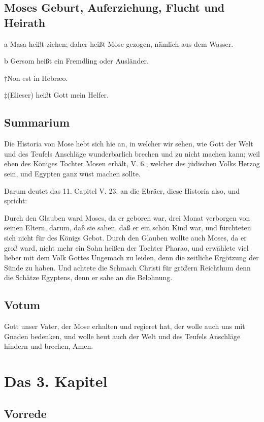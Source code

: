 \section{Moses Geburt, Auferziehung, Flucht und Heirath}

a Masa heißt ziehen; daher heißt Mose gezogen, nämlich aus dem Wasser.

b Gersom heißt ein Fremdling oder Ausländer.

†Non est in Hebræo.

‡(Elieser) heißt Gott mein Helfer.

\section{Summarium}

Die Historia von Mose hebt sich hie an, in welcher wir sehen, wie Gott der Welt und des Teufels Anschläge wunderbarlich brechen und zu nicht machen kann; weil eben des Königes Tochter Mosen erhält, V. 6., welcher des jüdischen Volks Herzog sein, und Egypten ganz wüst machen sollte.

Darum deutet das 11. Capitel V. 23. an die Ebräer, diese Historia also, und spricht:

Durch den Glauben ward Moses, da er geboren war, drei Monat verborgen von seinen Eltern, darum, daß sie sahen, daß er ein schön Kind war, und fürchteten sich nicht für des Königs Gebot. Durch den Glauben wollte auch Moses, da er groß ward, nicht mehr ein Sohn heißen der Tochter Pharao, und erwählete viel lieber mit dem Volk Gottes Ungemach zu leiden, denn die zeitliche Ergötzung der Sünde zu haben. Und achtete die Schmach Christi für größern Reichthum denn die Schätze Egyptens, denn er sahe an die Belohnung.

\section{Votum}

Gott unser Vater, der Mose erhalten und regieret hat, der wolle auch uns mit Gnaden bedenken, und wolle heut auch der Welt und des Teufels Anschläge hindern und brechen, Amen.

\chapter{Das 3. Kapitel}

\section{Vorrede}

